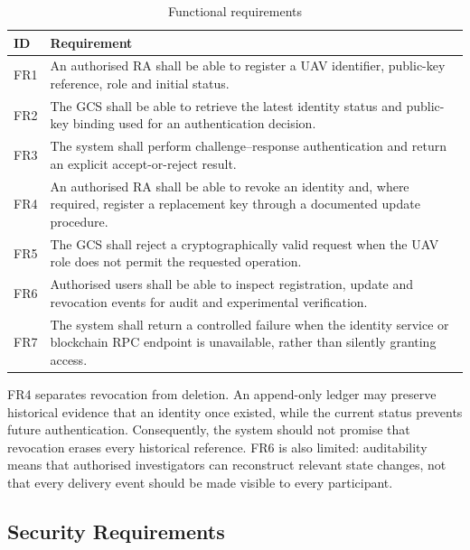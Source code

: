 \begin{table}[htbp]
    \centering
    \caption{Functional requirements}
    \label{tab:functional-requirements}
    \begin{tabular}{|p{}|p{}|}
        \hline
        \textbf{ID} & \textbf{Requirement} \\
        \hline
        FR1 & An authorised RA shall be able to register a UAV identifier, public-key reference, role and initial status. \\
        \hline
        FR2 & The GCS shall be able to retrieve the latest identity status and public-key binding used for an authentication decision. \\
        \hline
        FR3 & The system shall perform challenge--response authentication and return an explicit accept-or-reject result. \\
        \hline
        FR4 & An authorised RA shall be able to revoke an identity and, where required, register a replacement key through a documented update procedure. \\
        \hline
        FR5 & The GCS shall reject a cryptographically valid request when the UAV role does not permit the requested operation. \\
        \hline
        FR6 & Authorised users shall be able to inspect registration, update and revocation events for audit and experimental verification. \\
        \hline
        FR7 & The system shall return a controlled failure when the identity service or blockchain RPC endpoint is unavailable, rather than silently granting access. \\
        \hline
    \end{tabular}
\end{table}

FR4 separates revocation from deletion. An append-only ledger may preserve historical evidence that an identity once existed, while the current status prevents future authentication. Consequently, the system should not promise that revocation erases every historical reference. FR6 is also limited: auditability means that authorised investigators can reconstruct relevant state changes, not that every delivery event should be made visible to every participant.

\subsection{Security Requirements}
\label{subsec:security-requirements}

